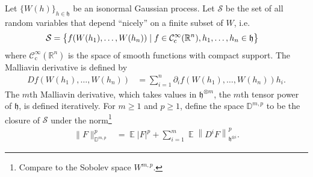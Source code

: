 \documentclass{article}
\DeclareMathOperator{\expect}{\mathbb{E}}
\begin{document}
Let \(\{W(h)\}_{h \in \mathfrak{h}}\) be an isonormal Gaussian process.
Let \(\mathcal S\) be the set of all random variables that depend ``nicely'' on a finite subset of \(W\), i.e.
\begin{align*}
  \mathcal S &= \cbr{
    f(W(h_1), \ldots, W(h_n))
    \mid f \in \mathcal C^\infty_\mathrm{c}(\mathbb{R}^n),
    h_1, \ldots, h_n \in \mathfrak{h}
  }
\end{align*}
where \(\mathcal C^\infty_\mathrm{c}(\mathbb{R}^n)\) is the space of smooth functions with compact support.
The Malliavin derivative is defined by
\begin{align*}
  D f(W(h_1), \ldots, W(h_n)) &= \sum_{i=1}^n \partial_i f(W(h_1), \ldots, W(h_n)) h_i.
\end{align*}
The \(m\)th Malliavin derivative, which takes values in \(\mathfrak{h}^{\otimes m}\), the \(m\)th tensor power of \(\mathfrak{h}\), is defined iteratively.
For \(m \geq 1\) and \(p \geq 1\), define the space \(\mathbb{D}^{m, p}\) to be the closure of \(\mathcal S\) under the norm\footnote{Compare to the Sobolev space \(W^{m,p}\).}
\begin{align*}
  \|F\|_{\mathbb{D}^{m, p}}^p &=  \expect \left|F\right|^p + \sum_{i=1}^m \expect \left\|D^i F\right\|_{\mathfrak{h}^{\otimes i}}^p.
\end{align*}
\end{document}
